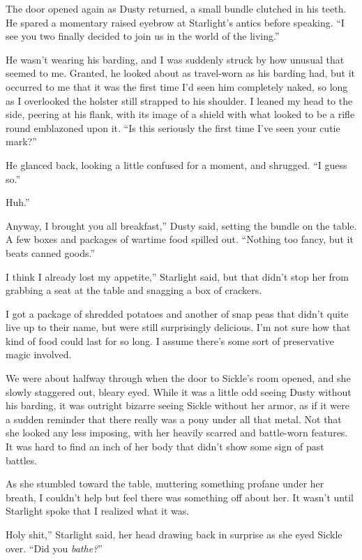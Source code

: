 The door opened again as Dusty returned, a small bundle clutched in his teeth. He spared a momentary raised eyebrow at Starlight’s antics before speaking. “I see you two finally decided to join us in the world of the living.”

He wasn’t wearing his barding, and I was suddenly struck by how unusual that seemed to me. Granted, he looked about as travel-worn as his barding had, but it occurred to me that it was the first time I’d seen him completely naked, so long as I overlooked the holster still strapped to his shoulder. I leaned my head to the side, peering at his flank, with its image of a shield with what looked to be a rifle round emblazoned upon it. “Is this seriously the first time I’ve seen your cutie mark?”

He glanced back, looking a little confused for a moment, and shrugged. “I guess so.”

\leavevmode{}Huh.”

\leavevmode{}Anyway, I brought you all breakfast,” Dusty said, setting the bundle on the table. A few boxes and packages of wartime food spilled out. “Nothing too fancy, but it beats canned goods.”

\leavevmode{}I think I already lost my appetite,” Starlight said, but that didn’t stop her from grabbing a seat at the table and snagging a box of crackers.

I got a package of shredded potatoes and another of snap peas that didn’t quite live up to their name, but were still surprisingly delicious. I’m not sure how that kind of food could last for so long. I assume there’s some sort of preservative magic involved.

We were about halfway through when the door to Sickle’s room opened, and she slowly staggered out, bleary eyed. While it was a little odd seeing Dusty without his barding, it was outright bizarre seeing Sickle without her armor, as if it were a sudden reminder that there really was a pony under all that metal. Not that she looked any less imposing, with her heavily scarred and battle-worn features. It was hard to find an inch of her body that didn’t show some sign of past battles.

As she stumbled toward the table, muttering something profane under her breath, I couldn’t help but feel there was something off about her. It wasn’t until Starlight spoke that I realized what it was.

\leavevmode{}Holy shit,” Starlight said, her head drawing back in surprise as she eyed Sickle over. “Did you \textit{bathe?}”

